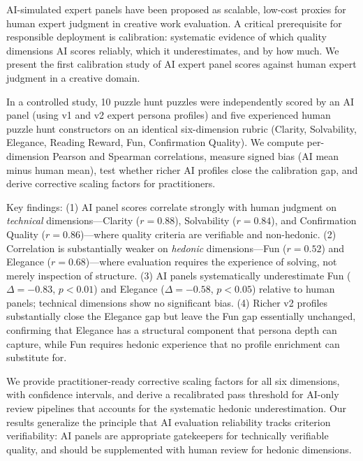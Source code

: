 AI-simulated expert panels have been proposed as scalable, low-cost proxies for human expert judgment in creative work evaluation. A critical prerequisite for responsible deployment is calibration: systematic evidence of which quality dimensions AI scores reliably, which it underestimates, and by how much. We present the first calibration study of AI expert panel scores against human expert judgment in a creative domain.

In a controlled study, 10 puzzle hunt puzzles were independently scored by an AI panel (using v1 and v2 expert persona profiles) and five experienced human puzzle hunt constructors on an identical six-dimension rubric (Clarity, Solvability, Elegance, Reading Reward, Fun, Confirmation Quality). We compute per-dimension Pearson and Spearman correlations, measure signed bias (AI mean minus human mean), test whether richer AI profiles close the calibration gap, and derive corrective scaling factors for practitioners.

Key findings: (1) AI panel scores correlate strongly with human judgment on \emph{technical} dimensions---Clarity ($r = 0.88$), Solvability ($r = 0.84$), and Confirmation Quality ($r = 0.86$)---where quality criteria are verifiable and non-hedonic. (2) Correlation is substantially weaker on \emph{hedonic} dimensions---Fun ($r = 0.52$) and Elegance ($r = 0.68$)---where evaluation requires the experience of solving, not merely inspection of structure. (3) AI panels systematically underestimate Fun ($\Delta = -0.83$, $p < 0.01$) and Elegance ($\Delta = -0.58$, $p < 0.05$) relative to human panels; technical dimensions show no significant bias. (4) Richer v2 profiles substantially close the Elegance gap but leave the Fun gap essentially unchanged, confirming that Elegance has a structural component that persona depth can capture, while Fun requires hedonic experience that no profile enrichment can substitute for.

We provide practitioner-ready corrective scaling factors for all six dimensions, with confidence intervals, and derive a recalibrated pass threshold for AI-only review pipelines that accounts for the systematic hedonic underestimation. Our results generalize the principle that AI evaluation reliability tracks criterion verifiability: AI panels are appropriate gatekeepers for technically verifiable quality, and should be supplemented with human review for hedonic dimensions.
